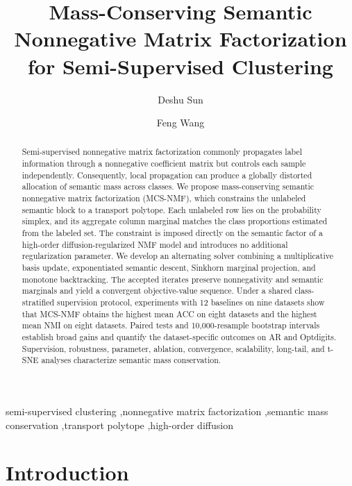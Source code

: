 \documentclass[times, review, 10pt]{elsarticle}
\begin{document}
\raggedbottom
\begin{frontmatter}

\title{Mass-Conserving Semantic Nonnegative Matrix Factorization for Semi-Supervised Clustering}

\author{Deshu Sun}
\author{Feng Wang}
\address{College of Data Science and Information Engineering, Guizhou Minzu University, Guiyang, Guizhou 550025, P.R. China}

\begin{abstract}
Semi-supervised nonnegative matrix factorization commonly propagates label information through a nonnegative coefficient matrix but controls each sample independently. Consequently, local propagation can produce a globally distorted allocation of semantic mass across classes. We propose mass-conserving semantic nonnegative matrix factorization (MCS-NMF), which constrains the unlabeled semantic block to a transport polytope. Each unlabeled row lies on the probability simplex, and its aggregate column marginal matches the class proportions estimated from the labeled set. The constraint is imposed directly on the semantic factor of a high-order diffusion-regularized NMF model and introduces no additional regularization parameter. We develop an alternating solver combining a multiplicative basis update, exponentiated semantic descent, Sinkhorn marginal projection, and monotone backtracking. The accepted iterates preserve nonnegativity and semantic marginals and yield a convergent objective-value sequence. Under a shared class-stratified supervision protocol, experiments with 12 baselines on nine datasets show that MCS-NMF obtains the highest mean ACC on eight datasets and the highest mean NMI on eight datasets. Paired tests and 10,000-resample bootstrap intervals establish broad gains and quantify the dataset-specific outcomes on AR and Optdigits. Supervision, robustness, parameter, ablation, convergence, scalability, long-tail, and t-SNE analyses characterize semantic mass conservation.
\end{abstract}

\begin{keyword}
semi-supervised clustering \sep nonnegative matrix factorization \sep semantic mass conservation \sep transport polytope \sep high-order diffusion
\end{keyword}
\end{frontmatter}

\section{Introduction}
\end{document}
